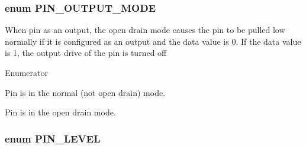 \hypertarget{group___peripheral_ga62483064e24f6949ab0a9b9234b4e549}{
\subsubsection[{P\-I\-N\-\_\-\-O\-U\-T\-P\-U\-T\-\_\-\-M\-O\-D\-E}]{\setlength{\rightskip}{0pt plus 5cm}enum {\bf P\-I\-N\-\_\-\-O\-U\-T\-P\-U\-T\-\_\-\-M\-O\-D\-E}}}\label{group___peripheral_ga62483064e24f6949ab0a9b9234b4e549}
When pin as an output, the open drain mode causes the pin to be pulled low normally if it is configured as an output and the data value is 0. If the data value is 1, the output drive of the pin is turned off \begin{Desc}
\item[Enumerator]\par
\begin{description}
\item[{\em 
\hypertarget{group___peripheral_gga62483064e24f6949ab0a9b9234b4e549afd68b1a66f2a33ce77d4f6c7f8fc998a}{N\-O\-T\-\_\-\-O\-P\-E\-N}\label{group___peripheral_gga62483064e24f6949ab0a9b9234b4e549afd68b1a66f2a33ce77d4f6c7f8fc998a}
}]Pin is in the normal (not open drain) mode. \item[{\em 
\hypertarget{group___peripheral_gga62483064e24f6949ab0a9b9234b4e549aa90b62c376675b218528e2b0b0a7f123}{O\-P\-E\-N\-\_\-\-D\-R\-A\-I\-N}\label{group___peripheral_gga62483064e24f6949ab0a9b9234b4e549aa90b62c376675b218528e2b0b0a7f123}
}]Pin is in the open drain mode. \end{description}
\end{Desc}
\hypertarget{group___peripheral_ga445f12f54192283394084c5d36ab4dd1}{
\subsubsection[{P\-I\-N\-\_\-\-L\-E\-V\-E\-L}]{\setlength{\rightskip}{0pt plus 5cm}enum {\bf P\-I\-N\-\_\-\-L\-E\-V\-E\-L}}}\label{group___peripheral_ga445f12f54192283394084c5d36ab4dd1}
